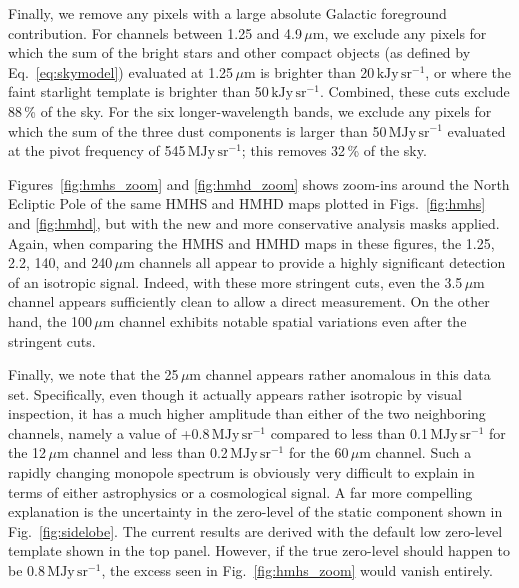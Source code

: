 \documentclass{aa}
\begin{document}
Finally, we remove any pixels with a large absolute Galactic
foreground contribution. For channels between 1.25 and
4.9\,$\mu\mathrm{m}$, we exclude any pixels for which the sum of the
bright stars and other compact objects (as defined by
Eq.~\ref{eq:skymodel}) evaluated at 1.25\,$\mu\mathrm{m}$ is brighter
than 20\,$\mathrm{kJy\,sr^{-1}}$, or where the faint starlight template is brighter
than 50\,$\mathrm{kJy\,sr^{-1}}$. Combined, these cuts exclude 88\,\% of the sky. For
the six longer-wavelength bands, we exclude any pixels for which the
sum of the three dust components is larger than 50\,$\mathrm{MJy\,sr^{-1}}$ evaluated
at the pivot frequency of 545\,$\mathrm{MJy\,sr^{-1}}$; this removes 32\,\% of the sky.


Figures~\ref{fig:hmhs_zoom} and \ref{fig:hmhd_zoom} shows zoom-ins
around the North Ecliptic Pole of the same HMHS and HMHD maps plotted
in Figs.~\ref{fig:hmhs} and \ref{fig:hmhd}, but with the new and more
conservative analysis masks applied. Again, when comparing the HMHS
and HMHD maps in these figures, the 1.25, 2.2, 140, and
240$\,\mu\mathrm{m}$ channels all appear to provide a highly
significant detection of an isotropic signal. Indeed, with these more
stringent cuts, even the 3.5$\,\mu\mathrm{m}$ channel appears
sufficiently clean to allow a direct measurement. On the other hand,
the 100$\,\mu\mathrm{m}$ channel exhibits notable spatial variations
even after the stringent cuts.

Finally, we note that the 25\,$\mu\mathrm{m}$ channel appears rather
anomalous in this data set. Specifically, even though it actually
appears rather isotropic by visual inspection, it has a much higher
amplitude than either of the two neighboring channels, namely a value
of +0.8\,$\mathrm{MJy\,sr^{-1}}$ compared to less than 0.1\,$\mathrm{MJy\,sr^{-1}}$ for the
12$\,\mu\mathrm{m}$ channel and less than 0.2\,$\mathrm{MJy\,sr^{-1}}$ for the
60$\,\mu\mathrm{m}$ channel. Such a rapidly changing monopole spectrum is
obviously very difficult to explain in terms of either astrophysics or
a cosmological signal. A far more compelling explanation is the
uncertainty in the zero-level of the static component shown in
Fig.~\ref{fig:sidelobe}. The current results are derived with the
default low zero-level template shown in the top panel. However, if
the true zero-level should happen to be 0.8\,$\mathrm{MJy\,sr^{-1}}$, the excess seen
in Fig.~\ref{fig:hmhs_zoom} would vanish entirely.
\end{document}
